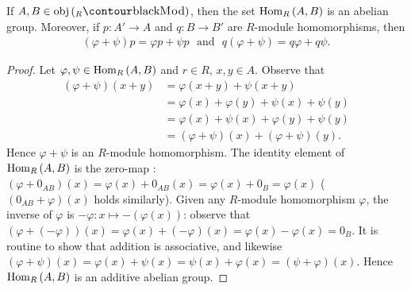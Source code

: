     \begin{lemma}\label{lemma:hom-ab-group}
        If $A,B \in \obj{({}_{R}\cMod)}$, then the set $\operatorname{Hom}_R{(A,B)}$ is an abelian group. Moreover, if $p:A' \rightarrow A$ and $q: B \rightarrow B'$ are $R$-module homomorphisms, then
            \begin{equation*}
            \begin{split}
                (\varphi+\psi)p = \varphi p + \psi p \hspace{8pt} \text{and} \hspace{8pt} q(\varphi+\psi) = q\varphi + q\psi.
            \end{split}
            \end{equation*} 
    \end{lemma}
        \begin{proof}
            Let $\varphi,\psi \in \operatorname{Hom}_R{(A,B)}$ and $r\in R$, $x,y\in A$. Observe that 
                \begin{equation*}
                \begin{split}
                    (\varphi+\psi)(x+y) 
                    & = \varphi(x+y)+\psi(x+y) \\
                    & = \varphi(x)+\varphi(y) + \psi(x) + \psi(y) \\
                    & = \varphi(x) + \psi(x) + \varphi(y) + \psi(y) \\
                    & = (\varphi+\psi)(x) + (\varphi+\psi)(y).
                \end{split}
                \end{equation*}
            Hence $\varphi+\psi$ is an $R$-module homomorphism. The identity element of $\operatorname{Hom}_R{(A,B)}$ is the zero-map : $(\varphi+0_{AB})(x) = \varphi(x) + 0_{AB}(x) = \varphi(x) + 0_B = \varphi(x)$ ($(0_{AB} + \varphi)(x)$ holds similarly). Given any $R$-module homomorphism $\varphi$, the inverse of $\varphi$ is $-\varphi:x \mapsto -(\varphi(x))$: observe that $(\varphi + (-\varphi))(x) = \varphi(x) + (-\varphi)(x) = \varphi(x) - \varphi(x) = 0_B$. It is routine to show that addition is associative, and likewise $(\varphi+\psi)(x) = \varphi(x) + \psi(x) = \psi(x) + \varphi(x) = (\psi+\varphi)(x)$. Hence $\operatorname{Hom}_R{(A,B)}$ is an additive abelian group.


\end{proof}

